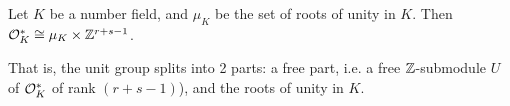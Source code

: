 \documentclass[11pt]{report}
\begin{document}
\begin{theorem}\label{dirunit}
    Let $K$ be a number field, and $\mu_K$ be the set of roots of unity in $K$. Then $\mathcal{O}_K^* \cong \mu_K \times \mathbb{Z}^{r + s - 1}$.
\end{theorem}
That is, the unit group splits into 2 parts: a free part, i.e. a free $\mathbb{Z}$-submodule $U$ of $\mathcal{O}_K^*$ of rank $(r + s - 1)$), and the roots of unity in $K$.









\end{document}
